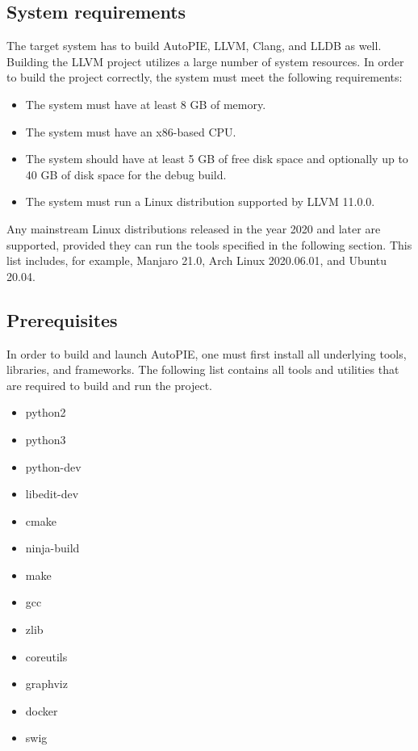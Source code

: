 \documentclass[12pt,a4paper]{report}
\begin{document}
\subsection{System requirements}

The target system has to build AutoPIE, LLVM, Clang, and LLDB as well. 
Building the LLVM project utilizes a large number of system resources.  
In order to build the project correctly, the system must meet the following 
requirements:
\begin{itemize}
  \item The system must have at least 8 GB of memory.
  \item The system must have an x86-based CPU.
  \item The system should have at least 5 GB of free disk space and 
  optionally up to 40 GB of disk space for the debug build.
  \item The system must run a Linux distribution supported by LLVM 11.0.0.
\end{itemize}

Any mainstream Linux distributions released in the year 2020 and later are 
supported, provided they can run the tools specified in the following 
section. 
This list includes, for example, Manjaro 21.0, Arch Linux 2020.06.01, and 
Ubuntu 20.04.

\subsection{Prerequisites}

In order to build and launch AutoPIE, one must first install all underlying 
tools, libraries, and frameworks. 
The following list contains all tools and utilities that are required to 
build and run the project.

\begin{itemize}
  \item python2
  \item python3
  \item python-dev
  \item libedit-dev
  \item cmake
  \item ninja-build
  \item make
  \item gcc
  \item zlib
  \item coreutils
  \item graphviz
  \item docker
  \item swig
\end{itemize}
\end{document}

